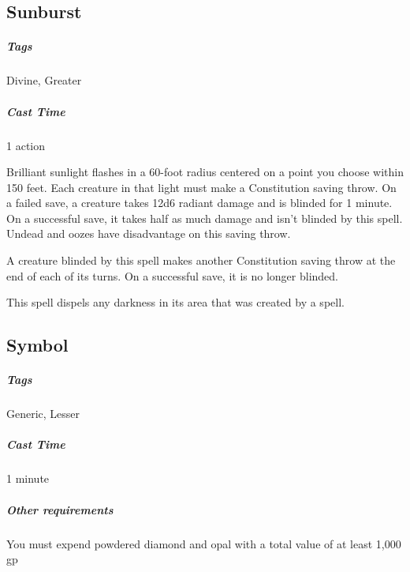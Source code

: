 



\subsection{Sunburst}\label{spell:sunburst}
\subparagraph*{Tags} Divine, Greater
\subparagraph*{Cast Time} 1 action

Brilliant sunlight flashes in a 60-foot radius centered on a point you choose within 150 feet. Each creature in that light must make a Constitution saving throw. On a failed save, a creature takes 12d6 radiant damage and is blinded for 1 minute. On a successful save, it takes half as much damage and isn't blinded by this spell. Undead and oozes have disadvantage on this saving throw.

A creature blinded by this spell makes another Constitution saving throw at the end of each of its turns. On a successful save, it is no longer blinded.

This spell dispels any darkness in its area that was created by a spell.

\subsection{Symbol}\label{spell:symbol}
\subparagraph*{Tags} Generic, Lesser
\subparagraph*{Cast Time} 1 minute
\subparagraph*{Other requirements} You must expend powdered diamond and opal with a total value of at least 1,000 gp

